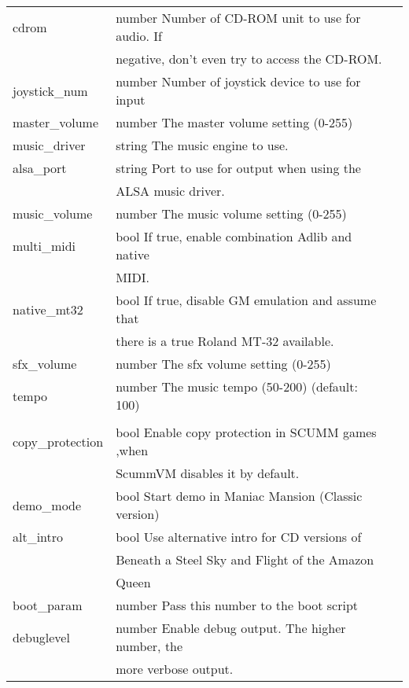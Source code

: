 \begin{tabular}[hf]{lll}
\\
        cdrom           &number   Number of CD-ROM unit to use for audio. If\\
                        &         negative, don't even try to access the CD-ROM.\\
        joystick\_num   &number   Number of joystick device to use for input\\
        master\_volume  &number   The master volume setting (0-255)\\
        music\_driver   &string   The music engine to use.\\
        alsa\_port      &string   Port to use for output when using the\\
                        &         ALSA music driver.\\
        music\_volume   &number   The music volume setting (0-255)\\
        multi\_midi     &bool     If true, enable combination Adlib and native\\
                        &         MIDI.\\
        native\_mt32    &bool     If true, disable GM emulation and assume that\\
                        &         there is a true Roland MT-32 available.\\
        sfx\_volume     &number   The sfx volume setting (0-255)\\
        tempo           &number   The music tempo (50-200) (default: 100)\\
\\
        copy\_protection&bool     Enable copy protection in SCUMM games ,when\\
                        &         ScummVM disables it by default.\\
        demo\_mode      &bool     Start demo in Maniac Mansion (Classic version)\\
        alt\_intro      &bool     Use alternative intro for CD versions of \\
                        &         Beneath a Steel Sky and Flight of the Amazon\\
                        &         Queen
\\
        boot\_param     &number   Pass this number to the boot script\\
        debuglevel      &number   Enable debug output. The higher number, the\\
                        &         more verbose output.\\
\end{tabular}

